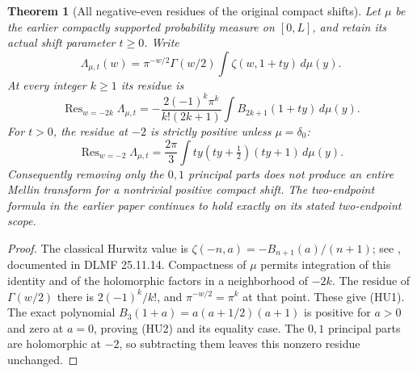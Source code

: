 \documentclass[11pt]{article}
\newtheorem{theorem}{Theorem}[section]
\begin{document}
\begin{theorem}[All negative-even residues of the original compact shifts]
Let $\mu$ be the earlier compactly supported probability measure
on $[0,L]$, and retain its actual shift parameter $t\ge0$. Write
\[
 \Lambda_{\mu,t}(w)=\pi^{-w/2}\Gamma(w/2)
             \int\zeta(w,1+ty)\,d\mu(y).
\]
At every integer $k\ge1$ its residue is
\[
 \operatorname{Res}_{w=-2k}\Lambda_{\mu,t}
 =-\frac{2(-1)^k\pi^k}{k!(2k+1)}
            \int B_{2k+1}(1+ty)\,d\mu(y).
 \tag{HU1}
\]
For $t>0$, the residue at $-2$ is strictly positive unless
$\mu=\delta_0$:
\[
 \operatorname{Res}_{w=-2}\Lambda_{\mu,t}
   =\frac{2\pi}{3}\int ty(ty+\tfrac12)(ty+1)\,d\mu(y).
 \tag{HU2}
\]
Consequently removing only the $0,1$ principal parts does not
produce an entire Mellin transform for a nontrivial positive
compact shift. The two-endpoint formula in the earlier paper
continues to hold exactly on its stated two-endpoint scope.
\end{theorem}
\begin{proof}
The classical Hurwitz value is
$\zeta(-n,a)=-B_{n+1}(a)/(n+1)$; see
\cite[Chapter 12]{cr:ApostolHurwitz}, documented in DLMF 25.11.14.
Compactness of $\mu$ permits integration of this identity and of
the holomorphic factors in a neighborhood of $-2k$.
The residue of $\Gamma(w/2)$ there is $2(-1)^k/k!$,
and $\pi^{-w/2}=\pi^k$ at that point. These give (HU1).
The exact polynomial
$B_3(1+a)=a(a+1/2)(a+1)$ is positive for $a>0$ and zero
at $a=0$, proving (HU2) and its equality case.
The $0,1$ principal parts are holomorphic at $-2$, so subtracting
them leaves this nonzero residue unchanged.
\end{proof}
\end{document}
